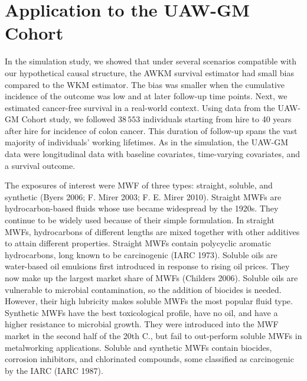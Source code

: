 \documentclass[
  11pt,
]{article}
\begin{document}
\hypertarget{application-to-the-uaw-gm-cohort}{%
\section{Application to the UAW-GM
Cohort}\label{application-to-the-uaw-gm-cohort}}

In the simulation study, we showed that under several scenarios
compatible with our hypothetical causal structure, the AWKM survival
estimator had small bias compared to the WKM estimator. The bias was
smaller when the cumulative incidence of the outcome was low and at
later follow-up time points. Next, we estimated cancer-free survival in
a real-world context. Using data from the UAW-GM Cohort study, we
followed \(38\,553\) individuals starting from hire to 40 years after
hire for incidence of colon cancer. This duration of follow-up spans the
vast majority of individuals' working lifetimes. As in the simulation,
the UAW-GM data were longitudinal data with baseline covariates,
time-varying covariates, and a survival outcome.

The exposures of interest were MWF of three types: straight, soluble,
and synthetic (Byers 2006; F. Mirer 2003; F. E. Mirer 2010). Straight
MWFs are hydrocarbon-based fluids whose use became widespread by the
1920s. They continue to be widely used because of their simple
formulation. In straight MWFs, hydrocarbons of different lengths are
mixed together with other additives to attain different properties.
Straight MWFs contain polycyclic aromatic hydrocarbons, long known to be
carcinogenic (IARC 1973). Soluble oils are water-based oil emulsions
first introduced in response to rising oil prices. They now make up the
largest market share of MWFs (Childers 2006). Soluble oils are
vulnerable to microbial contamination, so the addition of biocides is
needed. However, their high lubricity makes soluble MWFs the most
popular fluid type. Synthetic MWFs have the best toxicological profile,
have no oil, and have a higher resistance to microbial growth. They were
introduced into the MWF market in the second half of the 20th C., but
fail to out-perform soluble MWFs in metalworking applications. Soluble
and synthetic MWFs contain biocides, corrosion inhibitors, and
chlorinated compounds, some classified as carcinogenic by the IARC (IARC
1987).
\end{document}

